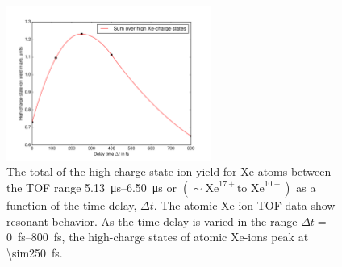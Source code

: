 %
\begin{figure}
	\centering
	\includegraphics[width=0.6\textwidth]{images/results/atomic-charge-state-time-resolved.png}
	\caption[Time-dependent response of atomic xenon in TOF spectroscopy.]{The total of the high-charge state ion-yield for Xe-atoms between the TOF range \SIrange{5.13}{6.50}{\micro\second} or $(\sim \text{Xe}^{17+} \text{to } \text{Xe}^{10+})$ as a function of the time delay, $\Delta t$. The atomic Xe-ion TOF data show resonant behavior. As the time delay is varied in the range $\Delta t=$ \SIrange{0}{800}{\femto\second}, the high-charge states of atomic Xe-ions peak at \SI{\sim250}{\femto\second}.}
	\label{fig:TOF-atomic-xenon-time-dependent}
\end{figure}
%
